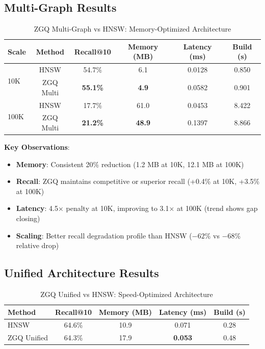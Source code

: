 \documentclass[11pt,a4paper]{article}
\begin{document}
\subsection{Multi-Graph Results}

\begin{table}[h]
\centering
\caption{ZGQ Multi-Graph vs HNSW: Memory-Optimized Architecture}
\begin{tabular}{lccccc}
\toprule
\textbf{Scale} & \textbf{Method} & \textbf{Recall@10} & \textbf{Memory (MB)} & \textbf{Latency (ms)} & \textbf{Build (s)} \\
\midrule
\multirow{2}{*}{10K} 
& HNSW & 54.7\% & 6.1 & 0.0128 & 0.850 \\
& ZGQ Multi & \textbf{55.1\%} & \textbf{4.9} & 0.0582 & 0.901 \\
\midrule
\multirow{2}{*}{100K} 
& HNSW & 17.7\% & 61.0 & 0.0453 & 8.422 \\
& ZGQ Multi & \textbf{21.2\%} & \textbf{48.9} & 0.1397 & 8.866 \\
\bottomrule
\end{tabular}
\end{table}

\textbf{Key Observations}:
\begin{itemize}
    \item \textbf{Memory}: Consistent 20\% reduction (1.2 MB at 10K, 12.1 MB at 100K)
    \item \textbf{Recall}: ZGQ maintains competitive or superior recall (+0.4\% at 10K, +3.5\% at 100K)
    \item \textbf{Latency}: 4.5× penalty at 10K, improving to 3.1× at 100K (trend shows gap closing)
    \item \textbf{Scaling}: Better recall degradation profile than HNSW ($-62\%$ vs $-68\%$ relative drop)
\end{itemize}

\subsection{Unified Architecture Results}

\begin{table}[h]
\centering
\caption{ZGQ Unified vs HNSW: Speed-Optimized Architecture}
\begin{tabular}{lcccc}
\toprule
\textbf{Method} & \textbf{Recall@10} & \textbf{Memory (MB)} & \textbf{Latency (ms)} & \textbf{Build (s)} \\
\midrule
HNSW & 64.6\% & 10.9 & 0.071 & 0.28 \\
ZGQ Unified & 64.3\% & 17.9 & \textbf{0.053} & 0.48 \\
\bottomrule
\end{tabular}
\end{table}
\end{document}

